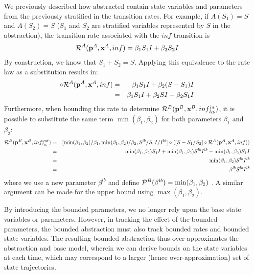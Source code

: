 We previously described how abstracted \Petrinets{} contain state variables and parameters from the previously stratified \Petrinet{} in the transition rates.  For example, if $A(S_1) = S$ and $A(S_2) = S$ ($S_1$ and $S_2$ are stratified
variables represented by $S$ in the abstraction), the transition rate associated with the $inf$ transition is
\[{\cal R}^A({\bf p}^A, {\bf x}^A, {inf}) = \beta_1 S_1 I +  \beta_2 S_2 I\]
By construction, we know that $S_1 + S_2 = S$. Applying this equivalence to the rate law as a substitution results in:
\begin{eqnarray*}
    [S-S_1/S_2]\circ {\cal R}^A({\bf p}^A, {\bf x}^A, {inf}) &=& \beta_1 S_1 I +  \beta_2 (S-S_1) I\\
     &=& \beta_1 S_1 I +  \beta_2 S I -  \beta_2 S_1 I    
\end{eqnarray*}
Furthermore, when bounding this rate to determine ${\cal R}^B({\bf p}^B, {\bf x}^B, inf^{in}_{I_{lb}})$, it is possible to substitute the same term $\min(\beta_1, \beta_2)$ for both parameters $\beta_1$ and $\beta_2$:
\begin{eqnarray*}
    {\cal R}^B({\bf p}^B, {\bf x}^B, inf^{out}_{I_{lb}})&=&
    [\min(\beta_1, \beta_2)/\beta_1, \min(\beta_1, \beta_2)/\beta_2, S^{lb}/S, I/I^{lb}]\circ(  [S-S_1/S_2]\circ {\cal R}^A({\bf p}^A, {\bf x}^A, {inf})) \\
    &=& \min(\beta_1, \beta_2) S_1 I +   \min(\beta_1, \beta_2) S^{lb} I^{lb} -   \min(\beta_1, \beta_2) S_1 I  \\
     &=& \min(\beta_1, \beta_2) S^{lb} I^{lb}\\
     &=& \beta^{lb}S^{lb} I^{lb}
\end{eqnarray*}
where we use a new parameter $\beta^{lb}$ and define ${\cal P}^B(\beta^{lb}) = \min(\beta_1, \beta_2)$ .  A similar argument can be made for the upper bound using
$ \max(\beta_1, \beta_2)$.

By introducing the bounded parameters, we no longer rely upon the base state
variables or parameters.  However, in tracking the effect of the bounded
parameters, the bounded abstraction must also track bounded rates and bounded
state variables.  The resulting bounded abstraction thus over-approximates the
abstraction and base model, wherein we can derive bounds on the state variables
at each time, which may correspond to a larger (hence over-approximation) set of
state trajectories.

